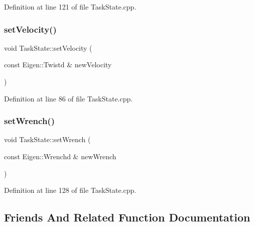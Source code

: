 Definition at line 121 of file Task\+State.\+cpp.

\hypertarget{classocra_1_1TaskState_ab689ec0b7ba14557f5f475f1feba22b0}{}\label{classocra_1_1TaskState_ab689ec0b7ba14557f5f475f1feba22b0} 
\subsubsection{\texorpdfstring{set\+Velocity()}{setVelocity()}}
{\footnotesize\ttfamily void Task\+State\+::set\+Velocity (\begin{DoxyParamCaption}\item[{const Eigen\+::\+Twistd \&}]{new\+Velocity }\end{DoxyParamCaption})}



Definition at line 86 of file Task\+State.\+cpp.

\hypertarget{classocra_1_1TaskState_a030fc926c45428d7ef99deb70ce5153e}{}\label{classocra_1_1TaskState_a030fc926c45428d7ef99deb70ce5153e} 
\subsubsection{\texorpdfstring{set\+Wrench()}{setWrench()}}
{\footnotesize\ttfamily void Task\+State\+::set\+Wrench (\begin{DoxyParamCaption}\item[{const Eigen\+::\+Wrenchd \&}]{new\+Wrench }\end{DoxyParamCaption})}



Definition at line 128 of file Task\+State.\+cpp.



\subsection{Friends And Related Function Documentation}
\hypertarget{classocra_1_1TaskState_a198f19e781235b9c28f8607c5b63f4a8}{}\label{classocra_1_1TaskState_a198f19e781235b9c28f8607c5b63f4a8} 
